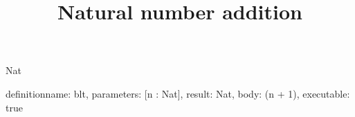 \begin{lexlean}{Nat}
\title{Natural number addition}
\begin{semanticmodule}
definition{name: blt, parameters: [n : Nat], result: Nat, body: (n + 1), executable: true}
\end{semanticmodule}
\end{lexlean}
